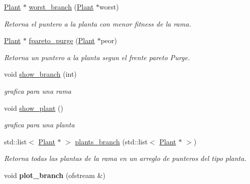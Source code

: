 \begin{DoxyCompactItemize}
\hyperlink{class_plant}{Plant} $\ast$ \hyperlink{class_plant_a0a576837260539510e8728af06d6d2cc}{worst\+\_\+branch} (\hyperlink{class_plant}{Plant} $\ast$worst)
\begin{DoxyCompactList}\small\item\em Retorna el puntero a la planta con menor fitness de la rama. \end{DoxyCompactList}\item 
\hyperlink{class_plant}{Plant} $\ast$ \hyperlink{class_plant_afbc29c83a69faf9bef5373b0be9e6771}{fpareto\+\_\+purge} (\hyperlink{class_plant}{Plant} $\ast$peor)
\begin{DoxyCompactList}\small\item\em Retorna un puntero a la planta segun el frente pareto Purge. \end{DoxyCompactList}\item 
void \hyperlink{class_plant_a20ec095b492846c876e1b56ee024530e}{show\+\_\+branch} (int)
\begin{DoxyCompactList}\small\item\em grafica para una rama \end{DoxyCompactList}\item 
\hypertarget{class_plant_a3a00ef0f158a88530dd4d18f75300aa7}{void \hyperlink{class_plant_a3a00ef0f158a88530dd4d18f75300aa7}{show\+\_\+plant} ()}\label{class_plant_a3a00ef0f158a88530dd4d18f75300aa7}

\begin{DoxyCompactList}\small\item\em grafica para una planta \end{DoxyCompactList}\item 
std\+::list$<$ \hyperlink{class_plant}{Plant} $\ast$ $>$ \hyperlink{class_plant_a225c7c67a5679b250bf3d5ea7eebced6}{plants\+\_\+branch} (std\+::list$<$ \hyperlink{class_plant}{Plant} $\ast$ $>$)
\begin{DoxyCompactList}\small\item\em Retorna todas las plantas de la rama en un arreglo de punteros del tipo planta. \end{DoxyCompactList}\item 
\hypertarget{class_plant_a788b3f0d092e593fbafb3bd7eb9e18a6}{void {\bfseries plot\+\_\+branch} (ofstream \&)}\label{class_plant_a788b3f0d092e593fbafb3bd7eb9e18a6}


\end{DoxyCompactItemize}

